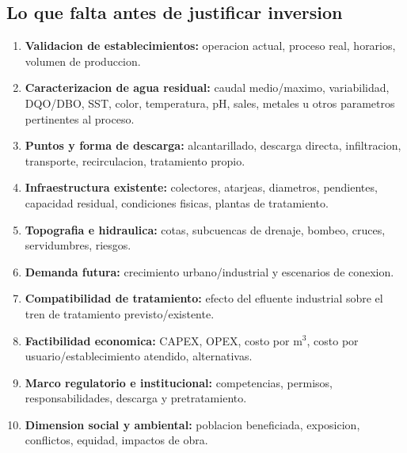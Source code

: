 \documentclass[11pt,letterpaper]{article}
\begin{document}
\subsection{Lo que falta antes de justificar inversion}
\begin{enumerate}
    \item \textbf{Validacion de establecimientos:} operacion actual, proceso real, horarios, volumen de produccion.
    \item \textbf{Caracterizacion de agua residual:} caudal medio/maximo, variabilidad, DQO/DBO, SST, color, temperatura, pH, sales, metales u otros parametros pertinentes al proceso.
    \item \textbf{Puntos y forma de descarga:} alcantarillado, descarga directa, infiltracion, transporte, recirculacion, tratamiento propio.
    \item \textbf{Infraestructura existente:} colectores, atarjeas, diametros, pendientes, capacidad residual, condiciones fisicas, plantas de tratamiento.
    \item \textbf{Topografia e hidraulica:} cotas, subcuencas de drenaje, bombeo, cruces, servidumbres, riesgos.
    \item \textbf{Demanda futura:} crecimiento urbano/industrial y escenarios de conexion.
    \item \textbf{Compatibilidad de tratamiento:} efecto del efluente industrial sobre el tren de tratamiento previsto/existente.
    \item \textbf{Factibilidad economica:} CAPEX, OPEX, costo por m$^3$, costo por usuario/establecimiento atendido, alternativas.
    \item \textbf{Marco regulatorio e institucional:} competencias, permisos, responsabilidades, descarga y pretratamiento.
    \item \textbf{Dimension social y ambiental:} poblacion beneficiada, exposicion, conflictos, equidad, impactos de obra.
\end{enumerate}
\end{document}

